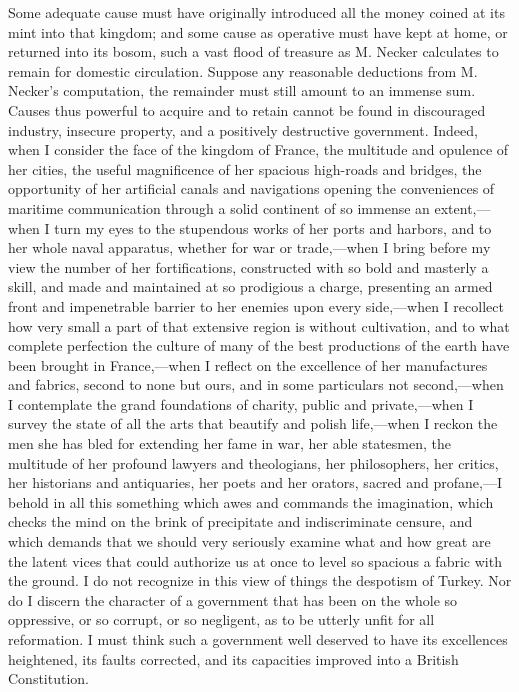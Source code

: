 Some adequate cause must have originally introduced all the money coined at its mint into that kingdom; and some cause as operative must have kept at home, or returned into its bosom, such a vast flood of treasure as M. Necker calculates to remain for domestic circulation. Suppose any reasonable deductions from M. Necker's computation, the remainder must still amount to an immense sum. Causes thus powerful to acquire and to retain cannot be found in discouraged industry, insecure property, and a positively destructive government. Indeed, when I consider the face of the kingdom of France, the multitude and opulence of her cities, the useful magnificence of her spacious high-roads and bridges, the opportunity of her artificial canals and navigations opening the conveniences of maritime communication through a solid continent of so immense an extent,—when I turn my eyes to the stupendous works of her ports and harbors, and to her whole naval apparatus, whether for war or trade,—when I bring before my view the number of her fortifications, constructed with so bold and masterly a skill, and made and maintained at so prodigious a charge, presenting an armed front and impenetrable barrier to her enemies upon every side,—when I recollect how very small a part of that extensive region is without cultivation, and to what complete perfection the culture of many of the best productions of the earth have been brought in France,—when I reflect on the excellence of her manufactures and fabrics, second to none but ours, and in some particulars not second,—when I contemplate the grand foundations of charity, public and private,—when I survey the state of all the arts that beautify and polish life,—when I reckon the men she has bled for extending her fame in war, her able statesmen, the multitude of her profound lawyers and theologians, her philosophers, her critics, her historians and antiquaries, her poets and her orators, sacred and profane,—I behold in all this something which awes and commands the imagination, which checks the mind on the brink of precipitate and indiscriminate censure, and which demands that we should very seriously examine what and how great are the latent vices that could authorize us at once to level so spacious a fabric with the ground. I do not recognize in this view of things the despotism of Turkey. Nor do I discern the character of a government that has been on the whole so oppressive, or so corrupt, or so negligent, as to be utterly unfit for all reformation. I must think such a government well deserved to have its excellences heightened, its faults corrected, and its capacities improved into a British Constitution.

